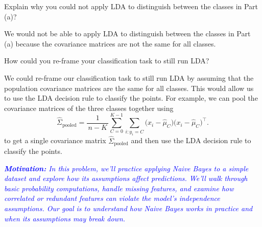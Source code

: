 \documentclass{article}
\begin{document}
\begin{probset}
\begin{prob}
\begin{subprobset}
        \begin{subprob}
            Explain why you could not apply LDA to distinguish between the classes in Part (a)?

            \begin{soln}
                We would not be able to apply LDA to distinguish between the classes in Part (a) because the covariance matrices are not the same for all classes.
            \end{soln}
        \end{subprob}

        \begin{subprob}
            How could you re-frame your classification task to still run LDA?

            \begin{soln}
                We could re-frame our classification task to still run LDA by assuming that the population covariance matrices are the same for all classes. This would allow us to use the LDA decision rule to classify the points. For example, we can pool the covariance matrices of the three classes together using 
                \[
                    \hat\Sigma_{\text{pooled}}
                    = \frac{1}{\,n - K\,}
                    \sum_{C=0}^{K-1}
                    \sum_{i : y_i = C}
                    \bigl(x_i - \hat{\mu}_C\bigr)\bigl(x_i - \hat{\mu}_C\bigr)^\top.
                \] 
                to get a single covariance matrix $\hat{\Sigma}_{\text{pooled}}$ and then use the LDA decision rule to classify the points.
            \end{soln}
        \end{subprob}
    \end{subprobset}
\end{prob}

\newpage
\begin{prob}
    \textit{\textcolor{blue}{\textbf{Motivation:} In this problem, we'll practice applying Naive Bayes to a simple dataset and explore how its assumptions affect predictions. We'll walk through basic probability computations, handle missing features, and examine how correlated or redundant features can violate the model's independence assumptions. Our goal is to understand how Naive Bayes works in practice and when its assumptions may break down.}}


\end{prob}
\end{probset}
\end{document}
